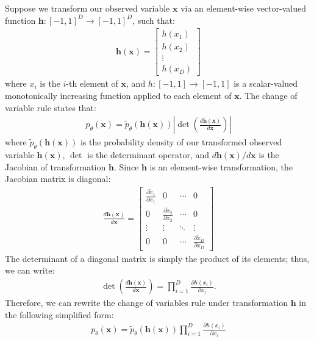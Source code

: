 \documentclass[ oneside,%
                    author={George Herbert},
                    degree={MSci},
                     title={Diffusion Models for Time-Evolving Precipitation Fields},
                  subtitle={}]{dissertation}
\begin{document}
Suppose we transform our observed variable $\mathbf{x}$ via an element-wise vector-valued function $\mathbf{h}:[-1, 1]^D\to[-1,1]^D$, such that:
\begin{align}
      \mathbf{h}(\mathbf{x})=
      \begin{bmatrix}
            h(x_1) \\
            h(x_2) \\
            \vdots \\
            h(x_D)
      \end{bmatrix}
\end{align}
where $x_i$ is the $i$-th element of $\mathbf{x}$, and $h:[-1, 1]\to[-1,1]$ is a scalar-valued monotonically increasing function applied to each element of $\mathbf{x}$. The change of variable rule states that:
\begin{align}
      p_\theta(\mathbf{x}) = \tilde{p}_\theta(\mathbf{h}(\mathbf{x}))\left|\det\left(\frac{d \mathbf{h}(\mathbf{x})}{d \mathbf{x}}\right)\right|
\end{align}
where $\tilde{p}_\theta(\mathbf{h}(\mathbf{x}))$ is the probability density of our transformed observed variable $\mathbf{h}(\mathbf{x})$, $\det$ is the determinant operator, and $d\mathbf{h}(\mathbf{x})/d\mathbf{x}$ is the Jacobian of transformation $\mathbf{h}$. Since $\mathbf{h}$ is an element-wise transformation, the Jacobian matrix is diagonal:
\begin{align}
      \frac{d\mathbf{h}(\mathbf{x})}{d\mathbf{x}} =
      \begin{bmatrix}
            \frac{\partial \tilde{x}_1}{\partial x_1} & 0 & \cdots & 0 \\
            0 & \frac{\partial \tilde{x}_2}{\partial x_2} & \cdots & 0 \\
            \vdots & \vdots & \ddots & \vdots \\
            0 & 0 & \cdots & \frac{\partial \tilde{x}_D}{\partial x_D}
      \end{bmatrix}
\end{align}
The determinant of a diagonal matrix is simply the product of its elements; thus, we can write:
\begin{align}
      \det\left(\frac{d\mathbf{h}(\mathbf{x})}{d\mathbf{x}}\right) = \prod_{i=1}^D \frac{\partial h(x_i)}{\partial x_i}.
\end{align}
Therefore, we can rewrite the change of variables rule under transformation $\mathbf{h}$ in the following simplified form:
\begin{align}
      p_\theta(\mathbf{x}) = \tilde{p}_\theta(\mathbf{h}(\mathbf{x}))\prod_{i=1}^D \frac{\partial h(x_i)}{\partial x_i}
\end{align}
\end{document}
